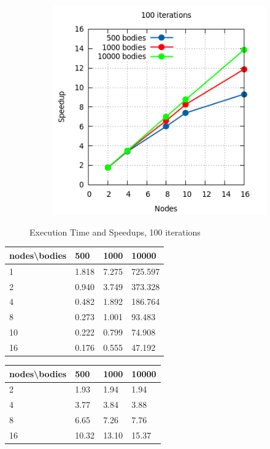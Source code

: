 \documentclass[a4paper]{article}
\begin{document}
\begin{figure}[ht]
\begin{subfigure}{.5\textwidth}
\end{subfigure} %
\begin{subfigure}{.5\textwidth}
  \centering
  \includegraphics[width=1\linewidth]{results/graph16}
\end{subfigure} 
  \caption{Execution Time and Speedups, 100 iterations}
  \label{fig:R2}
\end{figure}
\FloatBarrier

\begin{minipage}[b]{.40\textwidth}
  \centering
  \begin{tabular}{l|l|l|l}
  \centering
nodes\textbackslash bodies & 500 & 1000 & 10000 \\ \hline
1 & 1.818 & 7.275 & 725.597 \\ \hline
2 & 0.940 & 3.749 & 373.328 \\ \hline
4 & 0.482 & 1.892 & 186.764 \\ \hline
8 & 0.273 & 1.001 & 93.483 \\ \hline
10 & 0.222 & 0.799 & 74.908 \\ \hline
16 & 0.176 & 0.555 & 47.192 \\ 
    \hline
  \end{tabular}
  \label{tab:R2_t1}
\end{minipage} \qquad
\begin{minipage}[b]{.40\textwidth}
  \centering
  \begin{tabular}{l|l|l|l}
nodes\textbackslash bodies & 500 & 1000 & 10000 \\ \hline
2 & 1.93 & 1.94 & 1.94 \\ \hline
4 & 3.77 & 3.84 & 3.88 \\ \hline
8 & 6.65 & 7.26 & 7.76 \\ \hline
16 & 10.32 & 13.10 & 15.37
  \end{tabular}
  \label{tab:R2_t2}
\end{minipage}	
\end{document}
